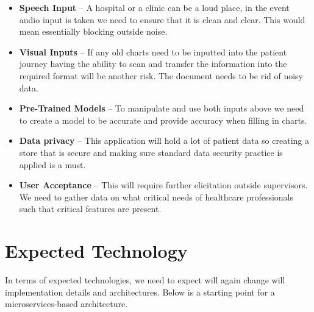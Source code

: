 \documentclass{article}
\begin{document}
\begin{itemize}
  \item \textbf{Speech Input} -- A hospital or a clinic can be a loud place, in the event audio input is taken we need to ensure that it is clean and clear. This would mean essentially blocking outside noise. 
  \item \textbf{Visual Inputs} -- If any old charts need to be inputted into the patient journey having the ability to scan and transfer the information into the required format will be another risk. The document needs to be rid of noisy data.
  \item \textbf{Pre-Trained Models} -- To manipulate and use both inputs above we need to create a model to be accurate and provide accuracy when filling in charts. 
  \item \textbf{Data privacy} -- This application will hold a lot of patient data so creating a store that is secure and making sure standard data security practice is applied is a must.
  \item \textbf{User Acceptance} -- This will require further elicitation outside supervisors. We need to gather data on what critical needs of healthcare professionals such that critical features are present. 
\end{itemize}

\section{Expected Technology}

In terms of expected technologies, we need to expect will again change will implementation details and architectures. Below is a starting point for a microservices-based architecture.
\end{document}
